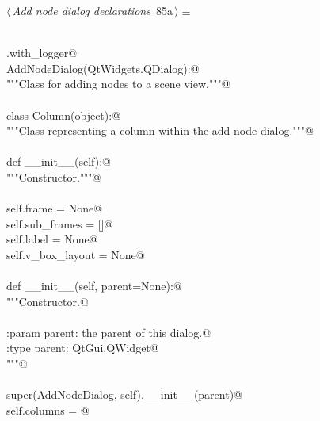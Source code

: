 \documentclass[
    a4paper,      %
    10pt,         %
    openright,    %
    notitlepage,  %
    parskip=half, %
]{scrreprt}       %
\theoremstyle{definition}                    %
\begin{document}
\begin{flushleft} \small
\begin{minipage}{\linewidth}\label{scrap136}\raggedright\small
{} $\langle\,${\itshape Add node dialog declarations}\nobreak\ {\footnotesize {85a}}$\,\rangle\equiv$
\vspace{-1exm}
\begin{list}{}{} \item
\mbox{}\lstinline@@\\
\mbox{}\lstinline@common.with_logger@\\
\mbox{}\lstinline@class AddNodeDialog(QtWidgets.QDialog):@\\
\mbox{}\lstinline@    """Class for adding nodes to a scene view."""@\\
\mbox{}\lstinline@@\\
\mbox{}\lstinline@    class Column(object):@\\
\mbox{}\lstinline@        """Class representing a column within the add node dialog."""@\\
\mbox{}\lstinline@@\\
\mbox{}\lstinline@        def __init__(self):@\\
\mbox{}\lstinline@            """Constructor."""@\\
\mbox{}\lstinline@@\\
\mbox{}\lstinline@            self.frame         = None@\\
\mbox{}\lstinline@            self.sub_frames    = []@\\
\mbox{}\lstinline@            self.label         = None@\\
\mbox{}\lstinline@            self.v_box_layout  = None@\\
\mbox{}\lstinline@@\\
\mbox{}\lstinline@    def __init__(self, parent=None):@\\
\mbox{}\lstinline@        """Constructor.@\\
\mbox{}\lstinline@@\\
\mbox{}\lstinline@        :param parent: the parent of this dialog.@\\
\mbox{}\lstinline@        :type  parent: QtGui.QWidget@\\
\mbox{}\lstinline@        """@\\
\mbox{}\lstinline@@\\
\mbox{}\lstinline@        super(AddNodeDialog, self).__init__(parent)@\\
\mbox{}\lstinline@        self.columns = {}@\\

\end{list}
\end{minipage}
\end{flushleft}
\end{document}
